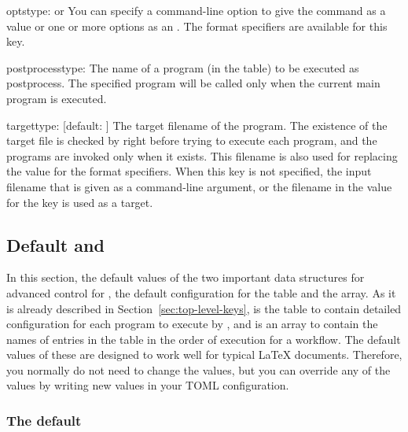 \documentclass{llmk-doc}
\begin{document}
\begin{confkey}{opts}{type:  or }
You can specify a command-line option to give the command as a 
value or one or more options as an . The format
specifiers are available for this key.
\end{confkey}

\begin{confkey}{postprocess}{type: }
The name of a program (in the  table) to be executed as
postprocess. The specified program will be called only when the current main
program is executed.
\end{confkey}

\begin{confkey}{target}{type: }[default: ]
The target filename of the program. The existence of the target file is checked
by  right before trying to execute each program, and the programs
are invoked only when it exists. This filename is also used for replacing the
value for the format specifiers. When this key is not specified, the input
filename that is given as a command-line argument, or the filename in the value
for the  key is used as a target.
\end{confkey}

\subsection{Default  and }

In this section, the default values of the two important data structures for
advanced control for , \ie the default configuration for the
 table and the  array. As it is already described
in Section~\ref{sec:top-level-keys},  is the table to contain
detailed configuration for each program to execute by , and
 is an array to contain the names of entries in the
 table in the order of execution for a workflow. The default
values of these are designed to work well for typical {\LaTeX} documents.
Therefore, you normally do not need to change the values, but you can override
any of the values by writing new values in your TOML configuration.

\subsubsection{The default }
\label{sec:default-programs}
\end{document}
